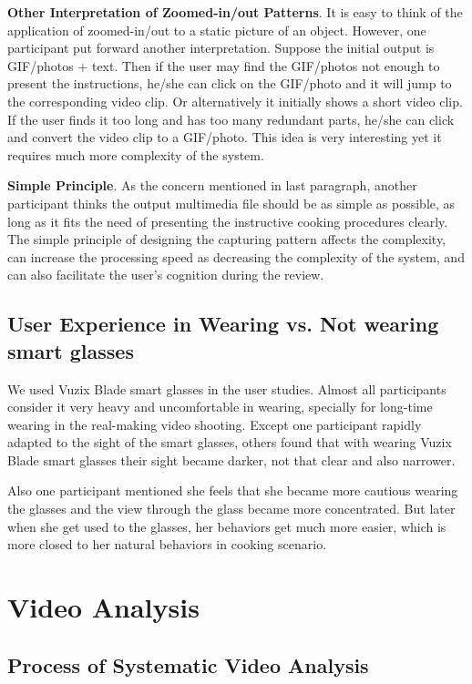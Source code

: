 \documentclass[fyp]{socreport}
\begin{document}
\textbf{Other Interpretation of Zoomed-in/out Patterns}. It is easy to think of the application of zoomed-in/out to a static picture of an object. However, one participant put forward another interpretation. Suppose the initial output is GIF/photos + text. Then if the user may find the GIF/photos not enough to present the instructions, he/she can click on the GIF/photo and it will jump to the corresponding video clip. Or alternatively it initially shows a short video clip. If the user finds it too long and has too many redundant parts, he/she can click and convert the video clip to a GIF/photo. This idea is very interesting yet it requires much more complexity of the system.

\textbf{Simple Principle}. As the concern mentioned in last paragraph, another participant thinks the output multimedia file should be as simple as possible, as long as it fits the need of presenting the instructive cooking procedures clearly. The simple principle of designing the capturing pattern affects the complexity, can increase the processing speed as decreasing the complexity of the system, and can also facilitate the user's cognition during the review.

\subsection{User Experience in Wearing vs. Not wearing smart glasses}
We used Vuzix Blade smart glasses in the user studies. Almost all participants consider it very heavy and uncomfortable in wearing, specially for long-time wearing in the real-making video shooting. Except one participant rapidly adapted to the sight of the smart glasses, others found that with wearing Vuzix Blade smart glasses their sight became darker, not that clear and also narrower.

Also one participant mentioned she feels that she became more cautious wearing the glasses and the view through the glass became more concentrated. But later when she get used to the glasses, her behaviors get much more easier, which is more closed to her natural behaviors in cooking scenario.

\section{Video Analysis}
\subsection{Process of Systematic Video Analysis}
\end{document}
